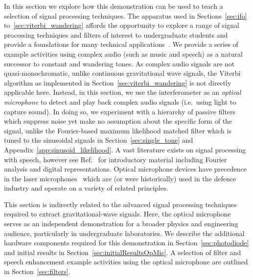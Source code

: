 \documentclass[paper-main.tex]{subfiles}
\begin{document}
In this section we explore how this demonstration can be used to teach a selection of signal processing techniques.
The apparatus used in Sections~\ref{sec:ifo} to~\ref{sec:viterbi_wandering} affords the opportunity to explore a range of signal processing techniques and filters of interest to undergraduate students and provide a foundations for many technical applications~\cite{DigitalProcingOfSpeechSignals:1978}. 
We provide a series of example activities using complex audio (such as music and speech) as a natural successor to constant and wandering tones. 
As complex audio signals are not quasi-monochromatic, unlike continuous gravitational wave signals, the Viterbi algorithm as implemented in Section~\ref{sec:viterbi_wandering} is not directly applicable here. Instead, in this section, we use the interferometer as an \emph{optical microphone} to detect and play back complex audio signals (i.e.\ using light to capture sound).
In doing so, we experiment with a hierarchy of passive filters which suppress noise yet make no assumption about the specific form of the signal, unlike the Fourier-based maximum likelihood matched filter which is tuned to the sinusoidal signals in Section~\ref{sec:single_tone} and Appendix~\ref{app:sinusoid_likelihood}.
A vast literature exists on signal processing with speech, however see Ref.~\cite{DigitalProcingOfSpeechSignals:1978} for introductory material including Fourier analysis and digital representations.
Optical microphone devices have precedence in the laser microphones~\cite{laser_microphone} which are (or were historically) used in the defence industry and operate on a variety of related principles.
  


This section is indirectly related to the advanced signal processing techniques required to extract gravitational-wave signals.
Here, the optical microphone serves as an independent demonstration for a broader physics and engineering audience, particularly in undergraduate laboratories.
We describe the additional hardware components required for this demonstration in Section~\ref{sec:photodiode} and initial results in Section~\ref{sec:initialResultsOpMic}. 
A selection of filter and speech enhancement example activities using the optical microphone are outlined in Section~\ref{sec:filters}.
\end{document}
